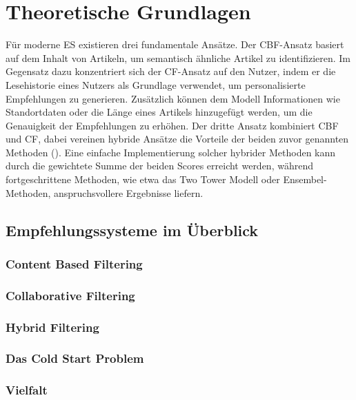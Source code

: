 \section{Theoretische Grundlagen}
Für moderne \ac{ES} existieren drei fundamentale Ansätze. 
Der \ac{CBF}-Ansatz basiert auf dem Inhalt von Artikeln, um semantisch ähnliche Artikel zu 
identifizieren. Im Gegensatz dazu konzentriert sich der \ac{CF}-Ansatz auf den Nutzer, 
indem er die Lesehistorie eines Nutzers als Grundlage verwendet, 
um personalisierte Empfehlungen zu generieren. Zusätzlich können dem Modell Informationen wie 
Standortdaten oder die Länge eines Artikels hinzugefügt werden, um die Genauigkeit der 
Empfehlungen zu erhöhen. Der dritte Ansatz kombiniert \ac{CBF} und \ac{CF}, 
dabei vereinen hybride Ansätze die Vorteile der beiden zuvor genannten Methoden (\cite{raza_news_2020}).
Eine einfache Implementierung solcher hybrider Methoden kann 
durch die gewichtete Summe der beiden Scores erreicht werden, während fortgeschrittene Methoden, 
wie etwa das Two Tower Modell oder Ensembel-Methoden, anspruchsvollere Ergebnisse liefern.

\subsection{Empfehlungssysteme im Überblick}
\subsubsection{Content Based Filtering}

\subsubsection{Collaborative Filtering}

\subsubsection{Hybrid Filtering}

\subsubsection{Das Cold Start Problem}

\subsubsection{Vielfalt}

